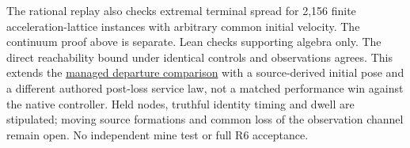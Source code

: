 \documentclass[11pt]{article}
\begin{document}
The rational replay also checks extremal terminal spread for 2,156 finite acceleration-lattice instances with arbitrary common initial velocity. The continuum proof above is separate. Lean checks supporting algebra only. The direct reachability bound under identical controls and observations agrees. This extends the \href{https://arxiv.org/html/2609.29939v1}{managed departure comparison} with a source-derived initial pose and a different authored post-loss service law, not a matched performance win against the native controller. Held nodes, truthful identity timing and dwell are stipulated; moving source formations and common loss of the observation channel remain open. No independent mine test or full R6 acceptance.
\end{document}
